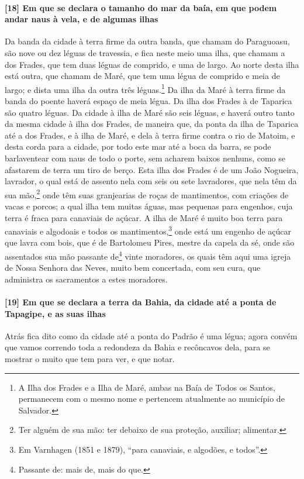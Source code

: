 \paragraph{[18] Em que se declara o tamanho do mar da baía, em que podem andar naus à vela,
e de algumas ilhas}\quad
Da banda da cidade à terra firme da outra banda, que chamam do Paraguoasu, são nove ou dez
léguas de travessia, e fica neste meio uma ilha, que chamam a dos Frades, que tem duas
léguas de comprido, e uma de largo. Ao norte desta ilha está outra, que chamam de Maré,
que tem uma légua de comprido e meia de largo; e dista uma ilha da outra três
léguas.\footnote{ A Ilha dos Frades e a Ilha de Maré, ambas na Baía de Todos os Santos,
permanecem com o mesmo nome e pertencem atualmente ao município de Salvador.} Da ilha da
Maré à terra firme da banda do poente haverá espaço de meia légua. Da ilha dos Frades à de
Taparica são quatro léguas. Da cidade à ilha de Maré são seis léguas, e haverá outro tanto
da mesma cidade à ilha dos Frades, de maneira que, da ponta da ilha de Taparica até a dos
Frades, e à ilha de Maré, e dela à terra firme contra o rio de Matoim, e desta corda para
a cidade, por todo este mar até a boca da barra, se pode barlaventear com naus de todo o
porte, sem acharem baixos nenhuns, como se afastarem de terra um tiro de berço. Esta ilha
dos Frades é de um João Nogueira, lavrador, o qual está de assento nela com seis ou sete
lavradores, que nela têm da sua mão,\footnote{ Ter alguém de sua mão: ter debaixo de sua
proteção, auxiliar; alimentar.} onde têm suas granjearias de roças de mantimentos, com
criações de vacas e porcos; a qual ilha tem muitas águas, mas pequenas para engenhos, cuja
terra é fraca para canaviais de açúcar. A ilha de Maré é muito boa terra para canaviais e
algodoais e todos os mantimentos,\footnote{ Em Varnhagen (1851 e 1879), ``para canaviais,
e algodões, e todos''.} onde está um engenho de açúcar que lavra com bois, que é de
Bartolomeu Pires, mestre da capela da sé, onde são assentados sua mão passante
de\footnote{ Passante de: mais de, mais do que.} vinte moradores, os quais têm aqui uma
igreja de Nossa Senhora das Neves, muito bem concertada, com seu cura, que administra os
sacramentos a estes moradores.

\paragraph{[19] Em que se declara a terra da Bahia, da cidade até a ponta de Tapagipe, e as
suas ilhas}\quad
Atrás fica dito como da cidade até a ponta do Padrão é uma légua; agora convém que vamos
correndo toda a redondeza da Bahia e recôncavos dela, para se mostrar o muito que tem para
ver, e que notar.

